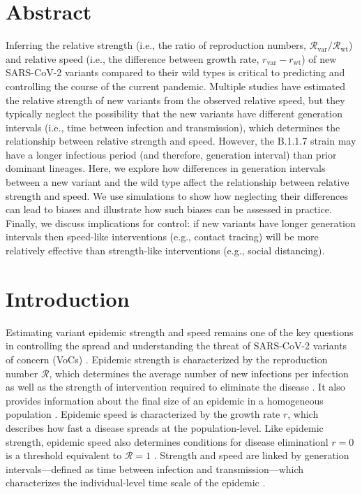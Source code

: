 \documentclass[12pt]{article}
\date{\today}
\newcommand{\vvvar}{\mathrm{var}}
\newcommand{\wwwt}{\mathrm{wt}}
\newcommand{\rx}[1]{\ensuremath{{r}_{#1}}\xspace}
\newcommand{\rw}{\rx{\wwwt}}
\newcommand{\rv}{\rx{\vvvar}}
\newcommand{\Rx}[1]{\ensuremath{{\mathcal R}_{#1}}\xspace}
\newcommand{\RR}{\ensuremath{{\mathcal R}}\xspace}
\newcommand{\Rw}{\Rx{\wwwt}}
\newcommand{\Rv}{\Rx{\vvvar}}
\begin{document}
\begin{flushleft}{
	\Large
	\textbf{}
}
\end{flushleft}

\section*{Abstract}

Inferring the relative strength (i.e., the ratio of reproduction numbers, $\Rv/\Rw$) and relative speed (i.e., the difference between growth rate, $\rv-\rw$) of new SARS-CoV-2 variants compared to their wild types is critical to predicting and controlling the course of the current pandemic.
Multiple studies have estimated the relative strength of new variants from the observed relative speed, but they typically neglect the possibility that the new variants have different generation intervals (i.e., time between infection and transmission), which determines the relationship between relative strength and speed.
However, the B.1.1.7 strain may have a longer infectious period (and therefore, generation interval) than prior dominant lineages.
Here, we explore how differences in generation intervals between a new variant and the wild type affect the relationship between relative strength and speed.
We use simulations to show how neglecting their differences can lead to biases and illustrate how such biases can be assessed in practice.
Finally, we discuss implications for control: if new variants have longer generation intervals then speed-like interventions (e.g., contact tracing) will be more relatively effective than strength-like interventions (e.g., social distancing).

\section{Introduction}

Estimating variant epidemic strength and speed remains one of the key questions in controlling the spread and understanding the threat of SARS-CoV-2 variants of concern (VoCs) \citep{switzerland2021variant, davies2021estimated, di2021impact, leung2021early, volz2021transmission,zhao2021}.
Epidemic strength is characterized by the reproduction number $\RR$, which determines the average number of new infections per infection as well as the strength of intervention required to eliminate the disease \citep{anderson1991infectious}.
It also provides information about the final size of an epidemic in a homogeneous population \citep{anderson1991infectious}.
Epidemic speed is characterized by the growth rate $r$, which describes how fast a disease spreads at the population-level.
Like epidemic strength, epidemic speed also determines conditions for disease eliminationl $r=0$ is a threshold equivalent to $\RR=1$ \citep{doi:10.1098/rspb.2020.1556}.
Strength and speed are linked by generation intervals---defined as time between infection and transmission---which characterizes the individual-level time scale of the epidemic \citep{roberts2007model,svensson2007note,wallinga2007generation}.
\end{document}
